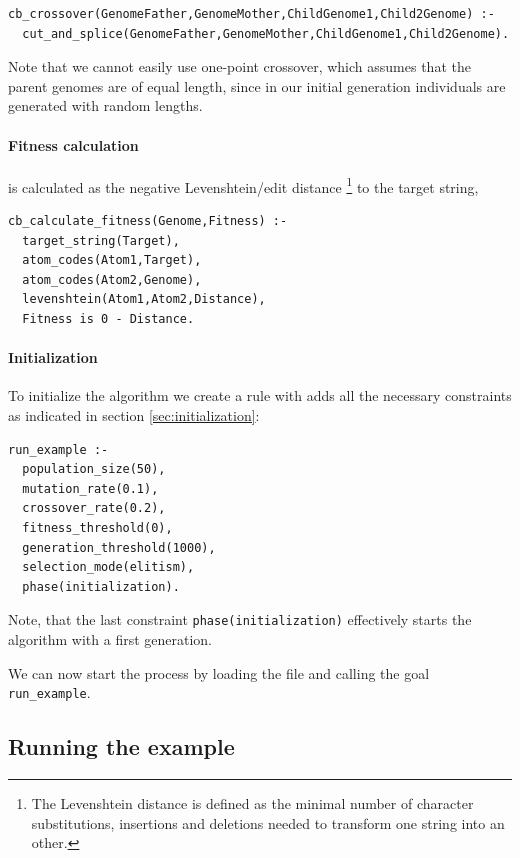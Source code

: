 \documentclass{article}
\begin{document}
\begin{verbatim}
cb_crossover(GenomeFather,GenomeMother,ChildGenome1,Child2Genome) :-
  cut_and_splice(GenomeFather,GenomeMother,ChildGenome1,Child2Genome).
\end{verbatim}

Note that we cannot easily use one-point crossover, which assumes that the parent genomes are of equal length, since in our initial generation individuals are generated
with random lengths.

\paragraph{Fitness calculation} is calculated as the negative Levenshtein/edit distance \footnote{The Levenshtein distance is defined as the minimal number of character substitutions, insertions and deletions needed to transform one string into an other.} to the target string,

\begin{verbatim}
cb_calculate_fitness(Genome,Fitness) :-
  target_string(Target),
  atom_codes(Atom1,Target),
  atom_codes(Atom2,Genome),
  levenshtein(Atom1,Atom2,Distance),
  Fitness is 0 - Distance.
\end{verbatim}

\paragraph{Initialization}

To initialize the algorithm we create a rule with adds all the necessary constraints as indicated in section \ref{sec:initialization}:

\begin{verbatim}
run_example :-
  population_size(50), 
  mutation_rate(0.1),
  crossover_rate(0.2),
  fitness_threshold(0),
  generation_threshold(1000),
  selection_mode(elitism), 
  phase(initialization). 
\end{verbatim}

Note, that the last constraint \verb|phase(initialization)| effectively starts the algorithm with a first generation.

We can now start the process by loading the file and calling the goal \verb|run_example|. 

\subsection{Running the example}
\end{document}
